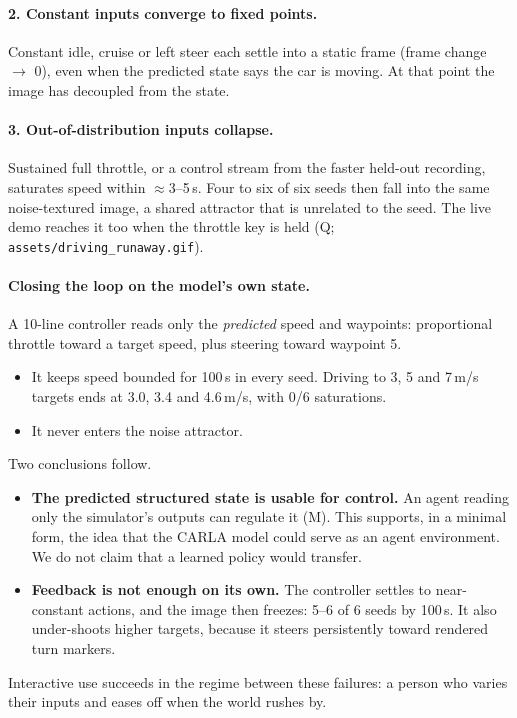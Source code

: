 \documentclass[11pt]{article}
\begin{document}
\paragraph{2. Constant inputs converge to fixed points.} Constant idle, cruise or left steer each settle into a static frame (frame change $\rightarrow$ 0), even when the predicted state says the car is moving. At that point the image has decoupled from the state.

\paragraph{3. Out-of-distribution inputs collapse.} Sustained full throttle, or a control stream from the faster held-out recording, saturates speed within $\approx$3--5\,s. Four to six of six seeds then fall into the same noise-textured image, a shared attractor that is unrelated to the seed. The live demo reaches it too when the throttle key is held (Q; \texttt{assets/driving\_runaway.gif}).

\paragraph{Closing the loop on the model's own state.} A 10-line controller reads only the \emph{predicted} speed and waypoints: proportional throttle toward a target speed, plus steering toward waypoint 5.
\begin{itemize}
  \item It keeps speed bounded for 100\,s in every seed. Driving to 3, 5 and 7\,m/s targets ends at 3.0, 3.4 and 4.6\,m/s, with 0/6 saturations.
  \item It never enters the noise attractor.
\end{itemize}
Two conclusions follow.
\begin{itemize}
  \item \textbf{The predicted structured state is usable for control.} An agent reading only the simulator's outputs can regulate it (M). This supports, in a minimal form, the idea that the CARLA model could serve as an agent environment. We do not claim that a learned policy would transfer.
  \item \textbf{Feedback is not enough on its own.} The controller settles to near-constant actions, and the image then freezes: 5--6 of 6 seeds by 100\,s. It also under-shoots higher targets, because it steers persistently toward rendered turn markers.
\end{itemize}
Interactive use succeeds in the regime between these failures: a person who varies their inputs and eases off when the world rushes by.
\end{document}
